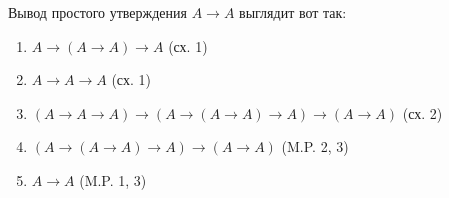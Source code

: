 Вывод простого утверждения $A\to A$ выглядит вот так:
\begin{enumerate}\itemsep=-1mm
    \item $A\to \left( A \to A \right) \to A$ (сх. 1)
    \item $A\to A\to A$ (сх. 1)
    \item $\left( A\to A\to A \right) \to \left( A\to \left( A\to A \right) \to A \right) \to \left( A\to A \right)$ (сх. 2)
    \item $\left( A\to \left( A\to A \right) \to A \right) \to \left( A\to A \right)$ (M.P. 2, 3)
    \item $A\to A$ (M.P. 1, 3)
\end{enumerate}

\endinput
